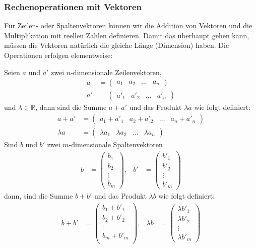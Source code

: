 \subsubsection{Rechenoperationen mit Vektoren}
Für Zeilen- oder Spaltenvektoren können wir die Addition von
Vektoren und die Multiplikation mit reellen Zahlen definieren.
Damit das überhaupt gehen kann, müssen die Vektoren natürlich
die gleiche Länge (Dimension) haben.
Die Operationen erfolgen elementweise:

\begin{definition}
Seien $a$ und $a'$ zwei $n$-dimensionale Zeilenvektoren,
\begin{align*}
a&=\begin{pmatrix}a_1&a_2&\dots&a_n\end{pmatrix}
\\
a'&=\begin{pmatrix}a'_1&a'_2&\dots&a'_n\end{pmatrix}
\end{align*}
und $\lambda\in\mathbb R$, dann sind die Summe $a+a'$ und das
Produkt $\lambda a$ wie folgt definiert:
\begin{align*}
a+a'&=\begin{pmatrix}a_1+a'_1&a_2+a'_2&\dots&a_n+a'_n\end{pmatrix}
\\
\lambda a&=\begin{pmatrix}\lambda a_1&\lambda a_2&\dots&\lambda a_n\end{pmatrix}
\end{align*}
Sind $b$ und $b'$ zwei $m$-dimensionale Spaltenvektoren
\begin{align*}
b&=\begin{pmatrix}b_1\\b_2\\\vdots\\b_m\end{pmatrix},
&
b'&=\begin{pmatrix}b'_1\\b'_2\\\vdots\\b'_m\end{pmatrix}
\end{align*}
dann, sind die Summe $b+b'$ und das Produkt $\lambda b$ wie folgt 
definiert:
\begin{align*}
b+b'&=\begin{pmatrix}
b_1+b'_1\\
b_2+b'_2\\
\vdots\\
b_m+b'_m\\
\end{pmatrix},
&
\lambda b&=\begin{pmatrix}
\lambda b'_1\\
\lambda b'_2\\
\vdots\\
\lambda b'_m
\end{pmatrix}
\end{align*}
\end{definition}
